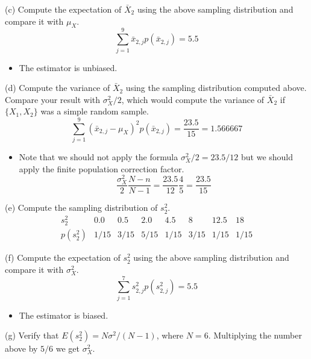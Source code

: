 \documentclass[
  11pt,
  ignorenonframetext,
]{beamer}
\providecommand{\tightlist}{%
  \setlength{\itemsep}{0pt}\setlength{\parskip}{0pt}}
\begin{document}
\begin{frame}{(c) Compute the expectation of \(\bar{X}_2\) using the
above sampling distribution and compare it with \(\mu_X\).}
\protect\hypertarget{c-compute-the-expectation-of-barx_2-using-the-above-sampling-distribution-and-compare-it-with-mu_x.}{}
\[
\sum_{j=1}^9 \bar{x}_{2,j}p(\bar{x}_{2,j})=5.5
\]

\begin{itemize}
\tightlist
\item
  The estimator is unbiased.
\end{itemize}
\end{frame}

\begin{frame}{(d) Compute the variance of \(\bar{X}_2\) using the
sampling distribution computed above. Compare your result with
\(\sigma^2_X/2\), which would compute the variance of \(\bar{X}_2\) if
\(\{X_1,X_2\}\) was a simple random sample.}
\protect\hypertarget{d-compute-the-variance-of-barx_2-using-the-sampling-distribution-computed-above.-compare-your-result-with-sigma2_x2-which-would-compute-the-variance-of-barx_2-if-x_1x_2-was-a-simple-random-sample.}{}
\[
\sum_{j=1}^9 (\bar{x}_{2,j}-\mu_X)^2p(\bar{x}_{2,j})=\frac{23.5}{15}=1.566667
\]

\begin{itemize}
\tightlist
\item
  Note that we should not apply the formula \(\sigma^2_X/2=23.5/12\) but
  we should apply the finite population correction factor. \[
  \frac{\sigma^2_X}{2}\frac{N-n}{N-1}=\frac{23.5}{12}\frac{4}{5}=\frac{23.5}{15}
  \]
\end{itemize}
\end{frame}

\begin{frame}{(e) Compute the sampling distribution of \(s^2_2\).}
\protect\hypertarget{e-compute-the-sampling-distribution-of-s2_2.}{}
\[
\begin{array}{c|ccccccc}
s^2_2 
& 0.0 &   0.5  &  2.0 & 4.5  &  8 & 12.5 &  18\\ \hline
p(s^2_2) & 1/15 & 3/15 & 5/15 &  1/15 & 3/15 & 1/15 & 1/15
\end{array}
\]
\end{frame}

\begin{frame}{(f) Compute the expectation of \(s^2_2\) using the above
sampling distribution and compare it with \(\sigma^2_X\).}
\protect\hypertarget{f-compute-the-expectation-of-s2_2-using-the-above-sampling-distribution-and-compare-it-with-sigma2_x.}{}
\[
\sum_{j=1}^7 s^2_{2,j}p(s^2_{2,j})=5.5
\]

\begin{itemize}
\tightlist
\item
  The estimator is biased.
\end{itemize}
\end{frame}

\begin{frame}{(g) Verify that \(E(s^2_2)=N\sigma^2/(N-1)\), where
\(N=6\).}
\protect\hypertarget{g-verify-that-es2_2nsigma2n-1-where-n6.}{}
Multiplying the number above by \(5/6\) we get \(\sigma^2_X\).
\end{frame}
\end{document}
